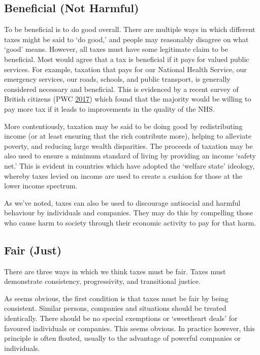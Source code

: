 \documentclass[]{tufte-handout}
\begin{document}
\hypertarget{beneficial-not-harmful}{%
\subsection{Beneficial (Not Harmful)}\label{beneficial-not-harmful}}

To be beneficial is to do good overall. There are multiple ways in which
different taxes might be said to `do good,' and people may reasonably
disagree on what `good' means. However, all taxes must have some
legitimate claim to be beneficial. Most would agree that a tax is
beneficial if it pays for valued public services. For example, taxation
that pays for our National Health Service, our emergency services, our
roads, schools, and public transport, is generally considered necessary
and beneficial. This is evidenced by a recent survey of British citizens
(PWC \protect\hyperlink{ref-PWC2017}{2017}) which found that the
majority would be willing to pay more tax if it leads to improvements in
the quality of the NHS.

More contentiously, taxation may be said to be doing good by
redistributing income (or at least ensuring that the rich contribute
more), helping to alleviate poverty, and reducing large wealth
disparities. The proceeds of taxation may be also used to ensure a
minimum standard of living by providing an income `safety net.' This is
evident in countries which have adopted the `welfare state' ideology,
whereby taxes levied on income are used to create a cushion for those at
the lower income spectrum.

As we've noted, taxes can also be used to discourage antisocial and
harmful behaviour by individuals and companies. They may do this by
compelling those who cause harm to society through their economic
activity to pay for that harm.

\hypertarget{fair-just}{%
\subsection{Fair (Just)}\label{fair-just}}

There are three ways in which we think taxes must be fair. Taxes must
demonstrate consistency, progressivity, and transitional justice.

As seems obvious, the first condition is that taxes must be fair by
being consistent. Similar persons, companies and situations should be
treated identically. There should be no special exemptions or
`sweetheart deals' for favoured individuals or companies. This seems
obvious. In practice however, this principle is often flouted, usually
to the advantage of powerful companies or individuals.
\end{document}
